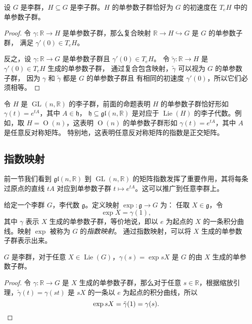 \documentclass[fontset=none]{Notes}
\DeclareMathOperator\GL{GL}
\DeclareMathOperator\Orth{O}
\DeclareMathOperator\Lie{Lie}
\newcommand{\lie}[1]{\mathfrak{#1}}
\begin{document}
\begin{proposition}\label{prop:one-parameter subgroup of lie subgroup}
  设 $G$ 是李群，$H\subseteq G$ 是李子群。$H$ 的单参数子群恰好为
  $G$ 的初速度在 $T_eH$ 中的单参数子群。
\end{proposition}
\begin{proof}
  令 $\gamma:\mathbb{R}\to H$ 是单参数子群，那么复合映射
  $\mathbb{R}\to H\hookrightarrow G$ 是 $G$ 的单参数子群，
  满足 $\gamma'(0)\in T_eH$。

  反之，设 $\gamma:\mathbb{R}\to G$ 是单参数子群且 $\gamma'(0)\in T_eH$。
  令 $\tilde{\gamma}:\mathbb{R}\to H$ 是 $\gamma'(0)\in T_eH$ 生成的单参数子群，
  通过复合包含映射，$\tilde{\gamma}$ 可以视为 $G$ 的单参数子群，
  因为 $\gamma$ 和 $\tilde{\gamma}$ 都是 $G$ 的单参数子群且
  有相同的初速度 $\gamma'(0)$，所以它们必须相等。
\end{proof}

\begin{example}
  令 $H$ 是 $\GL(n,\mathbb{R})$ 的李子群，前面的命题表明
  $H$ 的单参数子群恰好形如 $\gamma(t)=e^{tA}$，其中 $A\in\lie h$，
  $\lie h\subseteq \lie{gl}(n,\mathbb{R})$ 是对应于 $\Lie(H)$
  的李子代数。例如，取 $H=\Orth(n)$，这表明 $\Orth(n)$
  的单参数子群形如 $\gamma(t)=e^{tA}$，其中 $A$ 是任意反对称矩阵。
  特别地，这表明任意反对称矩阵的指数是正交矩阵。
\end{example}

\subsection{指数映射}

前一节我们看到 $\lie{gl}(n,\mathbb{R})$ 到 $\GL(n,\mathbb{R})$
的矩阵指数发挥了重要作用，其将每条过原点的直线 $tA$ 对应到单参数子群
$t\mapsto e^{tA}$。这可以推广到任意李群上。

给定一个李群 $G$，李代数 $\lie g$。定义映射 $\exp:\lie g\to G$ 为：
任取 $X\in \lie g$，令
\[
  \exp X=\gamma(1),  
\]
其中 $\gamma$ 表示 $X$ 生成的单参数子群，等价地说，即以 $e$ 为起点的
$X$ 的一条积分曲线。映射 $\exp$ 被称为 $G$ 的\emph{指数映射}。
通过指数映射，可以将 $X$ 生成的单参数子群表示出来。

\begin{proposition}
  $G$ 是李群，对于任意 $X\in\Lie(G)$，$\gamma(s)=\exp sX$ 是
  $G$ 的由 $X$ 生成的单参数子群。
\end{proposition}
\begin{proof}
  令 $\gamma:\mathbb{R}\to G$ 是 $X$ 生成的单参数子群，那么对于任意
  $s\in \mathbb{R}$，根据缩放引理，$\tilde{\gamma}(t)=\gamma(st)$
  是 $sX$ 的一条以 $e$ 为起点的积分曲线，所以
  \[
    \exp sX=\tilde{\gamma}(1)=\gamma(s).\qedhere  
  \]
\end{proof}
\end{document}
